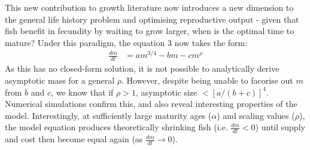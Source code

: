 \documentclass[a4paper]{article} %
\begin{document}
This new contribution to growth literature now introduces a new dimension to the general life history problem and optimising reproductive output - given that fish benefit in fecundity by waiting to grow larger, when is the optimal time to mature? Under this paradigm, the equation 3 now takes the form:
\begin{align}
    \frac{dm}{dt} &= am^{3/4} - bm - cm^{\rho}
\end{align}
As this has no closed-form solution, it is not possible to analytically derive asymptotic mass for a general $\rho$. However, despite being unable to facorise out $m$ from $b$ and $c$, we know that if $\rho > 1$, asymptotic size $< [a/(b+c)]^4$. Numerical simulations confirm this, and also reveal interesting properties of the model. Interestingly, at sufficiently large maturity ages ($\alpha$) and scaling values ($\rho$), the model equation produces theoretically shrinking fish (i.e. $\frac{dm}{dt} < 0$) until supply and cost then become equal again (as $\frac{dm}{dt} \rightarrow 0$). 
\end{document}
